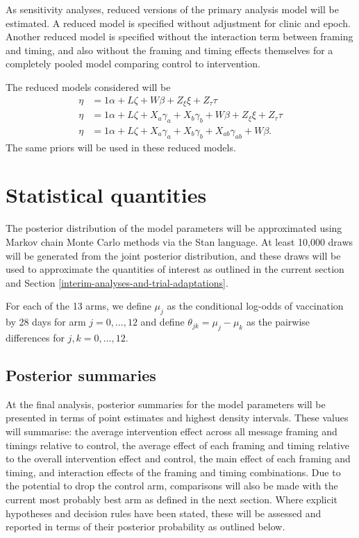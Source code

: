 \documentclass[
  bibliography=totoc]{scrreprt}
\begin{document}
As sensitivity analyses, reduced versions of the primary analysis model will be estimated.
A reduced model is specified without adjustment for clinic and epoch.
Another reduced model is specified without the interaction term between framing and timing, and also without the framing and timing effects themselves for a completely pooled model comparing control to intervention.

The reduced models considered will be
\[
\begin{aligned}
\eta &= 1\alpha + L\zeta + W\beta + Z_\xi\xi + Z_\tau\tau \\
\eta &= 1\alpha + L\zeta + X_a\gamma_a + X_b\gamma_b + W\beta + Z_\xi\xi + Z_\tau\tau \\
\eta &= 1\alpha + L\zeta + X_a\gamma_a + X_b\gamma_b + X_{ab}\gamma_{ab} + W\beta.
\end{aligned}
\]
The same priors will be used in these reduced models.

\hypertarget{statistical-quantities}{%
\section{Statistical quantities}\label{statistical-quantities}}

The posterior distribution of the model parameters will be approximated using Markov chain Monte Carlo methods via the Stan language.
At least 10,000 draws will be generated from the joint posterior distribution, and these draws will be used to approximate the quantities of interest as outlined in the current section and Section \ref{interim-analyses-and-trial-adaptations}.

For each of the 13 arms, we define \(\mu_j\) as the conditional log-odds of vaccination by 28 days for arm \(j=0,...,12\) and define \(\theta_{jk} = \mu_j - \mu_k\) as the pairwise differences for \(j,k=0,...,12\).

\hypertarget{posterior-summaries}{%
\subsection{Posterior summaries}\label{posterior-summaries}}

At the final analysis, posterior summaries for the model parameters will be presented in terms of point estimates and highest density intervals.
These values will summarise: the average intervention effect across all message framing and timings relative to control, the average effect of each framing and timing relative to the overall intervention effect and control, the main effect of each framing and timing, and interaction effects of the framing and timing combinations.
Due to the potential to drop the control arm, comparisons will also be made with the current most probably best arm as defined in the next section.
Where explicit hypotheses and decision rules have been stated, these will be assessed and reported in terms of their posterior probability as outlined below.
\end{document}
